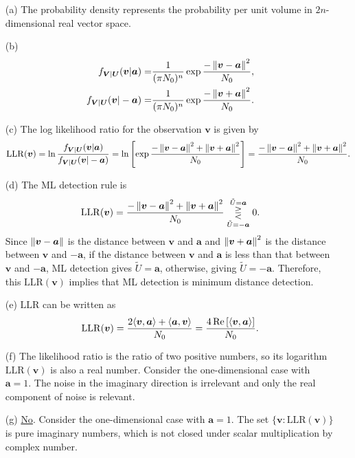 \documentclass{assignment}
\begin{document}
\begin{sol}
    \begin{itemize}
        \item[(a)] The probability density represents the probability per unit volume in $2n$-dimensional real vector space.
        \item[(b)] 
        \begin{align}
            f_{\bm{V}\vert\bm{U}}(\bm{v}\vert\bm{a})=&\frac{1}{(\pi N_0)^n}\exp\frac{-\left\lVert\bm{v}-\bm{a}\right\rVert^2}{N_0},\\
            f_{\bm{V}\vert\bm{U}}(\bm{v}\vert-\bm{a})=&\frac{1}{(\pi N_0)^n}\exp\frac{-\left\lVert\bm{v}+\bm{a}\right\rVert^2}{N_0}.
        \end{align}
        \item[(c)] The log likelihood ratio for the observation $\bm{v}$ is given by
        \begin{align}
            \mathrm{LLR}(\bm{v})=\ln\frac{f_{\bm{V}\vert\bm{U}}(\bm{v}\vert\bm{a})}{f_{\bm{V}\vert\bm{U}}(\bm{v}\vert-\bm{a})}=\ln\left[\exp\frac{-\left\lVert\bm{v}-\bm{a}\right\rVert^2+\left\lVert\bm{v}+\bm{a}\right\rVert^2}{N_0}\right]=\frac{-\left\lVert\bm{v}-\bm{a}\right\rVert^2+\left\lVert\bm{v}+\bm{a}\right\rVert^2}{N_0}.
        \end{align}
        \item[(d)] The ML detection rule is
        \begin{align}
            \mathrm{LLR}(\bm{v})=\frac{-\left\lVert\bm{v}-\bm{a}\right\rVert^2+\left\lVert\bm{v}+\bm{a}\right\rVert^2}{N_0}\underset{\tilde{U}=-\bm{a}}{\overset{\tilde{U}=\bm{a}}{\gtreqless}}0.
        \end{align}
        Since $\left\lVert\bm{v}-\bm{a}\right\rVert$ is the distance between $\bm{v}$ and $\bm{a}$ and $\left\lVert\bm{v}+\bm{a}\right\rVert^2$ is the distance between $\bm{v}$ and $-\bm{a}$, if the distance between $\bm{v}$ and $\bm{a}$ is less than that between $\bm{v}$ and $-\bm{a}$, ML detection gives $\tilde{U}=\bm{a}$, otherwise, giving $\tilde{U}=-\bm{a}$. Therefore, this $\mathrm{LLR}(\bm{v})$ implies that ML detection is minimum distance detection.
        \item[(e)] $\mathrm{LLR}$ can be written as
        \begin{align}
            \mathrm{LLR}(\bm{v})=\frac{2\langle\bm{v},\bm{a}\rangle+\langle\bm{a},\bm{v}\rangle}{N_0}=\frac{4\,\text{Re}\,[\langle\bm{v},\bm{a}\rangle]}{N_0}.
        \end{align}
        \item[(f)] The likelihood ratio is the ratio of two positive numbers, so its logarithm $\mathrm{LLR}(\bm{v})$ is also a real number. Consider the one-dimensional case with $\bm{a}=1$. The noise in the imaginary direction is irrelevant and only the real component of noise is relevant.
        \item[(g)] \uline{No}. Consider the one-dimensional case with $\bm{a}=1$. The set $\{\bm{v}:\mathrm{LLR}(\bm{v})\}$ is pure imaginary numbers, which is not closed under scalar multiplication by complex number.
    \end{itemize}
\end{sol}
\end{document}
